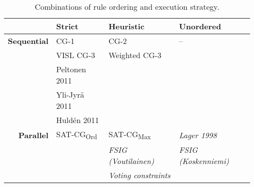 




\def\satcgMax{SAT-CG\textsubscript{Max}}
\def\satcgOrd{SAT-CG\textsubscript{Ord}}
\def\noncg#1{{\em \color{gray} #1}}

\begin{table}[h!]
\centering

  \begin{tabular}{r | p{2.5cm} | p{3.5 cm} | p{3.5cm}}
           & \textbf{Strict} & \textbf{Heuristic} & \textbf{Unordered} \\ \hline
\textbf{Sequential}
           & CG-1 \cite{karlsson1990cgp}   
                             & CG-2 \cite{tapanainen1996} %
                                                  & --           \\ 
           & VISL CG-3  \cite{vislcg3}      
                             & Weighted CG-3 \cite{pirinen2015} & \\ 
           & Peltonen 2011 \cite{peltonen2011}  &  &\\ %
           & Yli-Jyrä 2011 \cite{yli-jyra2011cg_engine}  & & \\ 
           & Huldén 2011 \cite{hulden2011cg_engine} & & \\ \hline
\textbf{Parallel}
           & \satcgOrd       & \satcgMax          & \noncg{Lager 1998 \cite{lager98}} \\ 
           &                 & \noncg{FSIG (Voutilainen) \cite{voutilainen1994designing}} 
                                                  & \noncg{FSIG (Koskenniemi) \cite{koskenniemi90}} \\
           &                 & \noncg{Voting constraints \cite{oflazer97votingconstraints}}  \\


  \end{tabular}
  \caption{Combinations of rule ordering and execution strategy.}
  \label{table:nelikentta}
\end{table}

